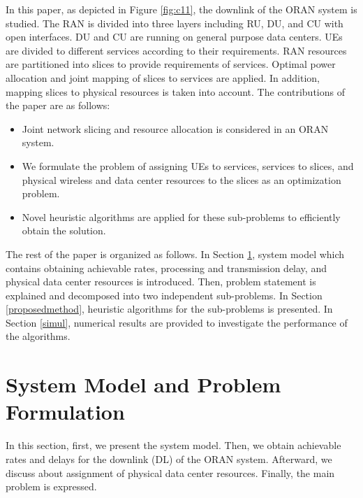 \documentclass[conference]{IEEEtran}
\begin{document}
In this paper, as  depicted in Figure \ref{fig:c11}, the downlink of the ORAN system is studied. The RAN is divided into three layers including RU, DU, and CU with open interfaces. DU and CU are running on general purpose data centers. UEs are divided to different services according to their requirements. RAN resources are partitioned into slices to provide requirements of services. Optimal power allocation and joint mapping of slices to services are applied. In addition, mapping slices to physical resources is taken into account. The contributions of the paper are as follows:
\begin{itemize}
\item Joint network slicing and resource allocation is considered in an ORAN system.
\item We formulate the problem of assigning UEs to services, services to slices, and physical wireless and data center resources to the slices as an optimization problem.
\item Novel heuristic algorithms are applied for these sub-problems to efficiently obtain the solution.
\end{itemize}

The rest of the paper is organized as follows. In Section \ref{systemmodel}, system model which contains obtaining achievable rates, processing and transmission delay, and physical data center resources is introduced. Then, problem statement is explained and decomposed into two independent sub-problems.
In Section \ref{proposedmethod}, heuristic algorithms for the sub-problems is presented. In Section \ref{simul}, numerical results are provided to investigate the performance of the algorithms.


\section{System Model and Problem Formulation}\label{systemmodel}

In this section, first, we  present the system model. Then, we obtain achievable rates and delays for the downlink (DL) of the ORAN system. Afterward, we discuss about assignment of physical data center resources.
Finally, the main problem is expressed.
\end{document}
